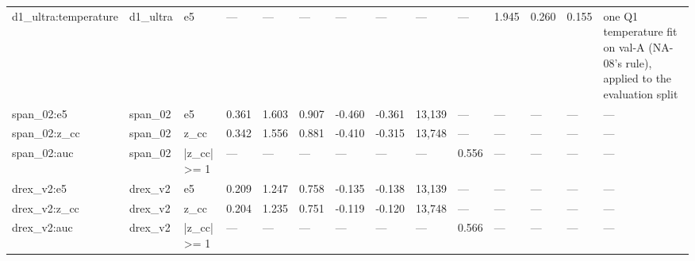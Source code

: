 \begin{tabular}{llllllllllllll}
d1\_ultra:temperature & d1\_ultra & e5 & — & — & — & — & — & — & — & 1.945 & 0.260 & 0.155 & one Q1 temperature fit on val-A (NA-08's rule), applied to the evaluation split \\
span\_02:e5 & span\_02 & e5 & 0.361 & 1.603 & 0.907 & -0.460 & -0.361 & 13,139 & — & — & — & — & — \\
span\_02:z\_cc & span\_02 & z\_cc & 0.342 & 1.556 & 0.881 & -0.410 & -0.315 & 13,748 & — & — & — & — & — \\
span\_02:auc & span\_02 & |z\_cc| >= 1 & — & — & — & — & — & — & 0.556 & — & — & — & — \\
drex\_v2:e5 & drex\_v2 & e5 & 0.209 & 1.247 & 0.758 & -0.135 & -0.138 & 13,139 & — & — & — & — & — \\
drex\_v2:z\_cc & drex\_v2 & z\_cc & 0.204 & 1.235 & 0.751 & -0.119 & -0.120 & 13,748 & — & — & — & — & — \\
drex\_v2:auc & drex\_v2 & |z\_cc| >= 1 & — & — & — & — & — & — & 0.566 & — & — & — & — \\
\bottomrule
\end{tabular}
